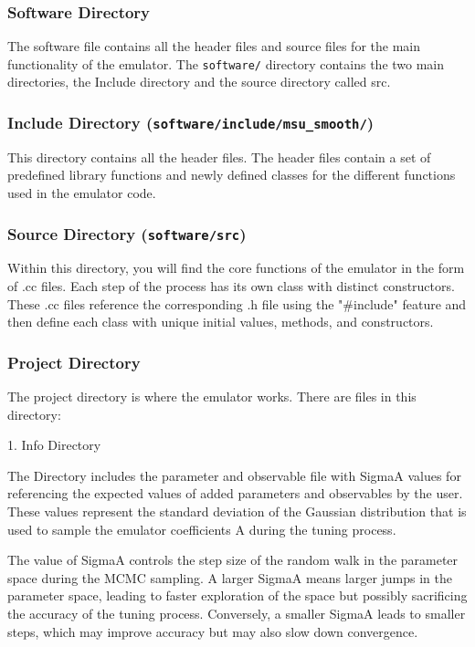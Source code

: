 \documentclass[12pt]{article}
\numberwithin{equation}{section}
\numberwithin{figure}{section}
\begin{document}
\subsubsection{Software Directory}

The software file contains all the header files and source files for the main functionality of the emulator. The {\tt software/} directory contains the two main directories, the Include directory and the source directory called src.

\subsubsection{Include Directory ({\tt software/include/msu_smooth/})}

This directory contains all the header files. The header files contain a set of predefined library functions and newly defined classes for the different functions used in the emulator code. 

\subsubsection{Source Directory ({\tt software/src})}

Within this directory, you will find the core functions of the emulator in the form of .cc files. Each step of the process has its own class with distinct constructors. These .cc files reference the corresponding .h file using the "\#include" feature and then define each class with unique initial values, methods, and constructors. 


\subsubsection{Project Directory}

The project directory is where the emulator works. There are files in this directory: 

1. Info Directory 

The Directory includes the parameter and observable file with SigmaA values for referencing the expected values of added parameters and observables by the user. These values represent the standard deviation of the Gaussian distribution that is used to sample the emulator coefficients A during the tuning process.

The value of SigmaA controls the step size of the random walk in the parameter space during the MCMC sampling. A larger SigmaA means larger jumps in the parameter space, leading to faster exploration of the space but possibly sacrificing the accuracy of the tuning process. Conversely, a smaller SigmaA leads to smaller steps, which may improve accuracy but may also slow down convergence.
\end{document}

